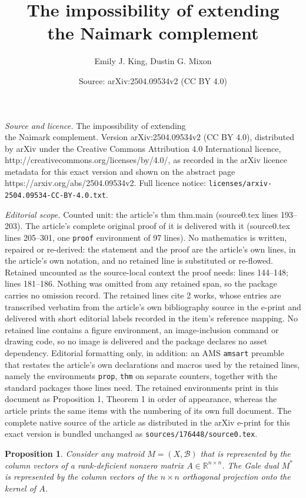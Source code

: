 \documentclass[10pt,a4paper]{amsart}
\title{The impossibility of extending\\the Naimark complement}
\author{Emily J. King, Dustin G. Mixon}
\date{Source: arXiv:2504.09534v2 (CC BY 4.0)}
\newtheorem{prop}{Proposition}
\newcommand{\bR}{\mathbb{R}}
\newcommand{\cB}{\mathcal{B}}
\begin{document}
\maketitle

\noindent\emph{Source and licence.} The impossibility of extending\\the Naimark complement. Version arXiv:2504.09534v2 (CC BY 4.0), distributed by arXiv under the Creative Commons Attribution 4.0 International licence, http://creativecommons.org/licenses/by/4.0/, as recorded in the arXiv licence metadata for this exact version and shown on the abstract page https://arxiv.org/abs/2504.09534v2. Full licence notice: \texttt{licenses/arxiv-2504.09534-CC-BY-4.0.txt}.\par\smallskip

\noindent\textit{Editorial scope.} Counted unit: the article's thm thm.main (source0.tex lines 193--203). The article's complete original proof of it is delivered with it (source0.tex lines 205--301, one \texttt{proof} environment of 97 lines). No mathematics is written, repaired or re-derived: the statement and the proof are the article's own lines, in the article's own notation, and no retained line is substituted or re-flowed.  Retained uncounted as the source-local context the proof needs: lines 144--148; lines 181--186.  Nothing was omitted from any retained span, so the package carries no omission record.  The retained lines cite 2 works, whose entries are transcribed verbatim from the article's own bibliography source in the e-print and delivered with short editorial labels recorded in the item's reference mapping.  No retained line contains a figure environment, an image-inclusion command or drawing code, so no image is delivered and the package declares no asset dependency.  Editorial formatting only, in addition: an AMS \texttt{amsart} preamble that restates the article's own declarations and macros used by the retained lines, namely the environments \texttt{prop}, \texttt{thm} on separate counters, together with the standard packages those lines need.  The retained environments print in this document as Proposition 1, Theorem 1 in order of appearance, whereas the article prints the same items with the numbering of its own full document.  The complete native source of the article as distributed in the arXiv e-print for this exact version is bundled unchanged as \texttt{sources/176448/source0.tex}.
\begin{prop}
\label{prop:matroid}
Consider any matroid $M=(X,\cB)$ that is represented by the column vectors of a rank-deficient nonzero matrix $A\in\bR^{n\times n}$.
The Gale dual $M^\ast$ is represented by the column vectors of the $n \times n$ orthogonal projection onto the kernel of $A$.
\end{prop}
\end{document}
